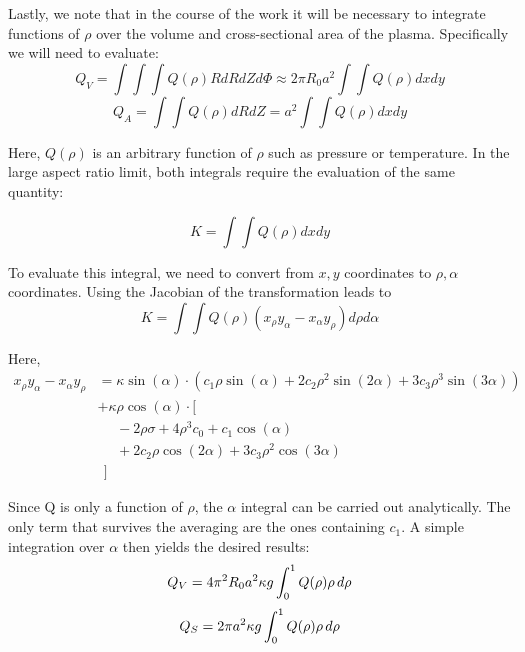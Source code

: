 Lastly, we note that in the course of the work it will be necessary to integrate functions of $\rho$ over the volume and cross-sectional area of the plasma. Specifically we will need to evaluate:
\begin{equation}
	Q_V = \int \int \int Q(\rho) R dR dZ d\Phi \approx 2 \pi R_0 a^2 \int \int Q(\rho) dx dy
\end{equation}
\begin{equation}
	Q_A = \int \int Q(\rho) dR dZ = a^2 \int \int Q(\rho) dx dy
\end{equation}

Here, $Q(\rho)$ is an arbitrary function of $\rho$ such as pressure or temperature. In the large aspect ratio limit, both integrals require the evaluation of the same quantity:

\begin{equation}
	K = \int \int Q(\rho) dx dy
\end{equation}

To evaluate this integral, we need to convert from $x, y$ coordinates to $\rho, \alpha$ coordinates. Using the Jacobian of the transformation leads to
\begin{equation}
	K = \int \int Q(\rho) (x_\rho y_\alpha - x_\alpha y_\rho ) d\rho d\alpha
\end{equation}

Here,
\begin{equation}
\begin{split}
	x_\rho y_\alpha - x_\alpha y_\rho & = \kappa \sin(\alpha) \cdot \left( c_1 \rho \sin(\alpha) + 2 c_2 \rho^2 \sin(2\alpha)  + 3 c_3 \rho^3 \sin(3\alpha)  \right) \\
		& + \kappa \rho \cos(\alpha) \cdot \Big[ \\
		& \ \ \ \ \ \ -2 \rho \sigma + 4 \rho^3 c_0 + c_1 \cos(\alpha) \\
		& \ \ \ \ \ \ + 2 c_2 \rho \cos(2\alpha) + 3 c_3 \rho^2 \cos(3\alpha) \\
		& \ \ \Big]
\end{split}	
\end{equation}

Since Q is only a function of $\rho$, the $\alpha$ integral can be carried out analytically. The only term that survives the averaging are the ones containing $c_1$. A simple integration over $\alpha$ then yields the desired results:
 \begin{equation}
  	\label{eq:qv}
 	Q_V = 4 \pi^2 R_0 a^2 \kappa g \int_0^1 Q(\rho) \rho \, d\rho
 	\myequations{Volume Integral -- $Q_V$}
 \end{equation}
\begin{equation}
	\label{eq:qs}
	Q_S = 2 \pi a^2 \kappa g \int_0^1 Q(\rho) \rho \, d\rho
	\myequations{Surface Integral -- $Q_S$}
\end{equation}
